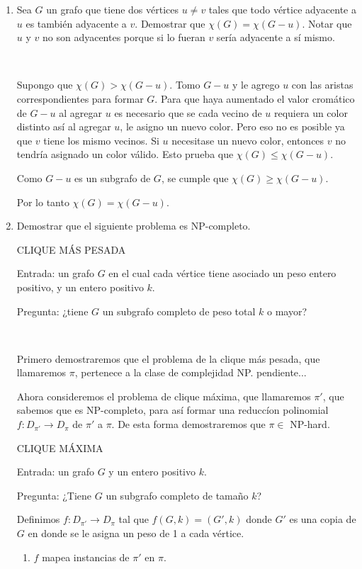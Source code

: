 \begin{enumerate}
\item
Sea $G$ un grafo que tiene dos vértices $u \not= v$ tales que todo vértice
adyacente a $u$ es también adyacente a $v$. Demostrar que
$\chi(G) = \chi(G - u)$. Notar que $u$ y $v$ no son adyacentes porque si lo
fueran $v$ sería adyacente a sí mismo.

~

Supongo que $\chi(G) > \chi(G - u)$. Tomo $G - u$ y le agrego $u$ con las
aristas correspondientes para formar $G$. Para que haya aumentado el valor
cromático de $G - u$ al agregar $u$ es necesario que se cada vecino de $u$
requiera un color distinto así al agregar $u$, le asigno un nuevo color.
Pero eso no es posible ya que $v$ tiene los mismo vecinos. Si $u$ necesitase
un nuevo color, entonces $v$ no tendría asignado un color válido. Esto prueba
que $\chi(G) \leq \chi(G - u)$.

Como $G - u$ es un subgrafo de $G$, se cumple que $\chi(G) \geq \chi(G - u)$.

Por lo tanto $\chi(G) = \chi(G - u)$.

\item
Demostrar que el siguiente problema es NP-completo.

CLIQUE MÁS PESADA

Entrada: un grafo $G$ en el cual cada vértice tiene asociado un peso entero
positivo, y un entero positivo $k$.

Pregunta: ¿tiene $G$ un subgrafo completo de peso total $k$ o mayor?

~

Primero demostraremos que el problema de la clique más pesada, que llamaremos
$\pi$, pertenece a la clase de complejidad NP. pendiente...

Ahora consideremos el problema de clique máxima, que llamaremos $\pi'$, que
sabemos que es NP-completo, para así formar una reduccíon polinomial
$f : D_{\pi'} \longrightarrow D_\pi$ de $\pi'$ a $\pi$. De esta forma
demostraremos que $\pi \in$ NP-hard.

CLIQUE MÁXIMA

Entrada: un grafo $G$ y un entero positivo $k$.

Pregunta: ¿Tiene $G$ un subgrafo completo de tamaño $k$?

Definimos $f : D_{\pi'} \longrightarrow D_\pi$ tal que $f(G, k) = (G', k)$
donde $G'$ es una copia de $G$ en donde se le asigna un peso de 1 a cada
vértice.

\begin{enumerate}
\item
$f$ mapea instancias de $\pi'$ en $\pi$.


\end{enumerate}
\end{enumerate}
